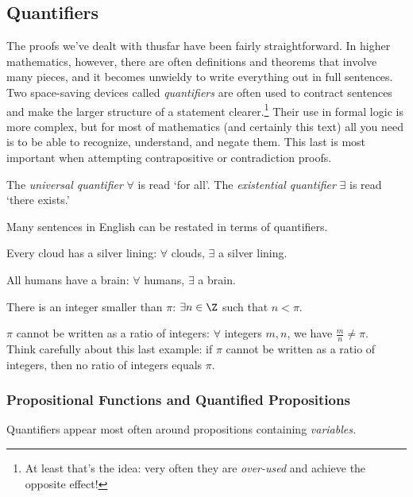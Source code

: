\newpage

\subsection{Quantifiers}\label{sec:quant}

The proofs we've dealt with thusfar have been fairly straightforward. In higher mathematics, however, there are often definitions and theorems that involve many pieces, and it becomes unwieldy to write everything out in full sentences. Two space-saving devices called \emph{quantifiers} are often used to contract sentences and make the larger structure of a statement clearer.\footnote{At least that's the idea: very often they are \emph{over-used} and achieve the opposite effect!} Their use in formal logic is more complex, but for most of mathematics (and certainly this text) all you need is to be able to recognize, understand, and negate them. This last is most important when attempting contrapositive or contradiction proofs.

\begin{defn}
The \emph{universal quantifier} $\forall$ is read `for all'. The \emph{existential quantifier} $\exists$ is read `there exists.'
\end{defn}

\noindent Many sentences in English can be restated in terms of quantifiers.

\begin{examples}
\item Every cloud has a silver lining: $\forall$ clouds, $\exists$ a silver lining.
\item All humans have a brain: $\forall$ humans, $\exists$ a brain.
\item There is an integer smaller than $\pi$: $\exists n\in\Z$ such that $n<\pi$.
\item $\pi$ cannot be written as a ratio of integers: $\forall$ integers $m,n$, we have $\frac{m}{n}\neq\pi$.\\
Think carefully about this last example: if $\pi$ cannot be written as a ratio of integers, then no ratio of integers equals $\pi$.
\end{examples}

\subsubsection*{Propositional Functions and Quantified Propositions}

Quantifiers appear most often around propositions containing \emph{variables.}

